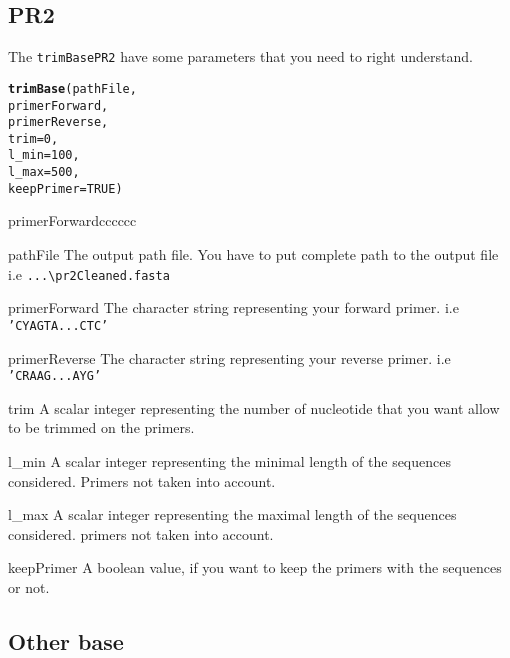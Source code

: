 \documentclass{article}\usepackage[]{graphicx}\usepackage[]{color}
\makeatletter
\newcommand{\hlnum}[1]{\textcolor[rgb]{0.686,0.059,0.569}{#1}}%
\newcommand{\hlstd}[1]{\textcolor[rgb]{0.345,0.345,0.345}{#1}}%
\newcommand{\hlkwc}[1]{\textcolor[rgb]{0.333,0.667,0.333}{#1}}%
\newcommand{\hlkwd}[1]{\textcolor[rgb]{0.737,0.353,0.396}{\textbf{#1}}}%
\newenvironment{kframe}{%
 \def\at@end@of@kframe{}%
 \ifinner\ifhmode%
  \def\at@end@of@kframe{\end{minipage}}%
  \begin{minipage}{\columnwidth}%
 \fi\fi%
 \def\FrameCommand##1{\hskip\@totalleftmargin \hskip-\fboxsep
 \colorbox{shadecolor}{##1}\hskip-\fboxsep
     \hskip-\linewidth \hskip-\@totalleftmargin \hskip\columnwidth}%
 \MakeFramed {\advance\hsize-\width
   \@totalleftmargin\z@ \linewidth\hsize
   \@setminipage}}%
 {\par\unskip\endMakeFramed%
 \at@end@of@kframe}
\newenvironment{knitrout}{}{} %
\makeatother
\begin{document}
\subsection{PR2}

The \texttt{trimBasePR2} have some parameters that you need to right understand.
\begin{knitrout}
\color{fgcolor}\begin{kframe}
\begin{alltt}
\hlkwd{trimBase}\hlstd{(pathFile,}
        \hlstd{primerForward,}
        \hlstd{primerReverse,}
        \hlkwc{trim} \hlstd{=} \hlnum{0}\hlstd{,}
        \hlkwc{l_min} \hlstd{=} \hlnum{100}\hlstd{,}
        \hlkwc{l_max} \hlstd{=} \hlnum{500}\hlstd{,}
        \hlkwc{keepPrimer} \hlstd{=} \hlnum{TRUE}\hlstd{)}
\end{alltt}
\end{kframe}
\end{knitrout}

\begin{labeling}{primerForwardcccccc}
	\item [pathFile] The output path file. You have to put complete path to the output file\\ i.e \texttt{...\textbackslash pr2Cleaned.fasta}
	\item [primerForward] The character string representing your forward primer. i.e \texttt{'CYAGTA...CTC'}
	\item [primerReverse] The character string representing your reverse primer. i.e \texttt{'CRAAG...AYG'}
	\item [trim] A scalar integer representing the number of nucleotide that you want allow to be trimmed on the primers.
	\item [l\_min] A scalar integer representing the minimal length of the sequences considered. Primers not taken into account.
	\item [l\_max] A scalar integer representing the maximal length of the sequences considered. primers not taken into account.
	\item [keepPrimer] A boolean value, if you want to keep the primers with the sequences or not.
\end{labeling}

\subsection{Other base}
\end{document}
